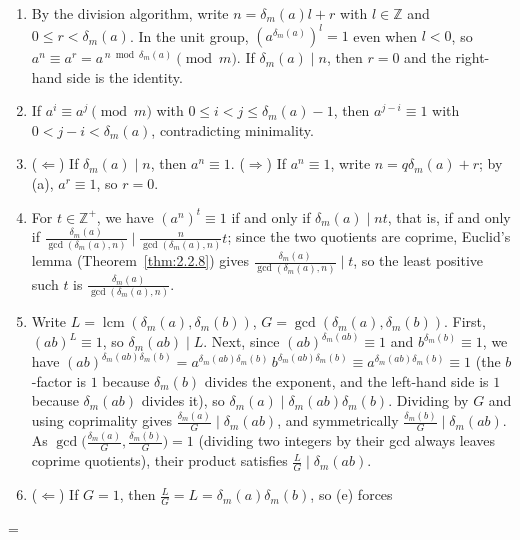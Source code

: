 \documentclass[11pt]{article}
\makeatletter
\let\nt@closedisplay\]
\def\nt@guardedclose{\@ifnextchar\par{\nt@closeafterpar}{\@ifnextchar\end{\postdisplaypenalty\@M\nt@closedisplay}{\nt@closedisplay}}}
\def\nt@closeafterpar\par{\@ifnextchar\par{\nt@closeafterpar}{\@ifnextchar\end{\postdisplaypenalty\@M\nt@closedisplay\par}{\nt@closedisplay\par}}}
\renewenvironment{proof}[1][\proofname]{\par
  \pushQED{\qed}\normalfont\topsep\medskipamount\edef\nt@afterproof{\@endparpenalty=\the\@endparpenalty\relax}\@beginparpenalty\@M\@endparpenalty\@M\let\]\nt@guardedclose\trivlist\item[]\textit{#1\@addpunct{.}} \ignorespaces}{\ifvmode\addpenalty\@M\fi\popQED\nt@afterproof\endtrivlist\@endpefalse}
\theoremstyle{ntstyle}
\DeclareMathOperator{\lcm}{lcm}
\makeatother
\begin{document}
\begin{proof}

  \begin{enumerate}[label={\alph*)}]
    \item By the division algorithm, write $n=\delta_m(a)l+r$ with
          $l\in\mathbb{Z}$ and $0\le r<\delta_m(a)$. In the unit group,
          $(a^{\delta_m(a)})^l=1$ even when $l<0$, so
          $a^n\equiv a^r=a^{\,n\bmod\delta_m(a)}\pmod{m}$.
          If $\delta_m(a)\mid n$, then $r=0$ and the right-hand side is the identity.
    \item If $a^{i} \equiv a^{j} \pmod{m}$ with $0 \le i < j \le \delta_m(a) - 1$, then $a^{j - i} \equiv 1$ with
    $0 < j - i < \delta_m(a)$, contradicting minimality.
    \item ($\Leftarrow$) If $\delta_m(a)\mid n$, then $a^n\equiv1$.
          ($\Rightarrow$) If $a^n\equiv1$, write $n=q\delta_m(a)+r$; by (a),
          $a^r\equiv1$, so $r=0$.
    \item For $t\in\mathbb{Z}^+$, we have $(a^n)^t \equiv 1$ if and only if $\delta_m(a) \mid nt$, that is, if and only if
            $\tfrac{\delta_m(a)}{\gcd(\delta_m(a), n)} \mid \tfrac{n}{\gcd(\delta_m(a), n)} t$; since the two quotients are
          coprime, Euclid's lemma (Theorem~\ref{thm:2.2.8}) gives
          $\tfrac{\delta_m(a)}{\gcd(\delta_m(a), n)} \mid t$, so the least positive such $t$ is
          $\tfrac{\delta_m(a)}{\gcd(\delta_m(a), n)}$.
    \item Write $L = \lcm(\delta_m(a), \delta_m(b))$, $G = \gcd(\delta_m(a), \delta_m(b))$. First, $(ab)^{L} \equiv 1$, so
          $\delta_m(ab) \mid L$. Next, since $(ab)^{\delta_m(ab)} \equiv 1$ and $b^{\delta_m(b)} \equiv 1$, we have
          $(ab)^{\delta_m(ab)\delta_m(b)} = a^{\delta_m(ab)\delta_m(b)}\,b^{\delta_m(ab)\delta_m(b)} \equiv a^{\delta_m(ab)\delta_m(b)} \equiv 1$
          (the $b$-factor is $1$ because $\delta_m(b)$ divides the exponent, and the left-hand side is $1$ because
          $\delta_m(ab)$ divides it), so $\delta_m(a) \mid \delta_m(ab)\delta_m(b)$. Dividing by $G$ and using
          coprimality gives
          $\tfrac{\delta_m(a)}{G} \mid \delta_m(ab)$, and symmetrically
          $\tfrac{\delta_m(b)}{G} \mid \delta_m(ab)$. As
          $\gcd\big(\tfrac{\delta_m(a)}{G},\tfrac{\delta_m(b)}{G}\big)=1$
          (dividing two integers by their gcd always leaves coprime quotients),
          their product satisfies $\tfrac{L}{G} \mid \delta_m(ab)$.
    \item ($\Leftarrow$) If $G = 1$, then $\tfrac{L}{G} = L = \delta_m(a)\delta_m(b)$, so (e) forces

\end{enumerate}
\end{proof}
\end{document}
